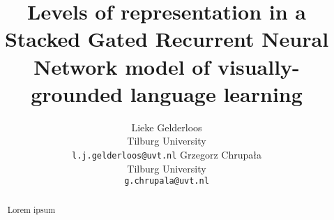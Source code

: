 \documentclass[11pt,letterpaper]{article}
\title{Levels of representation in a Stacked Gated Recurrent Neural
  Network model of visually-grounded language learning}
\author{Lieke Gelderloos \\
  Tilburg University \\
  {\tt l.j.gelderloos@uvt.nl} \And
  Grzegorz Chrupała \\
  Tilburg University \\
  {\tt g.chrupala@uvt.nl} }
\date{}
\begin{document}
\maketitle
\begin{abstract}
Lorem ipsum
\end{abstract}











\end{document}
